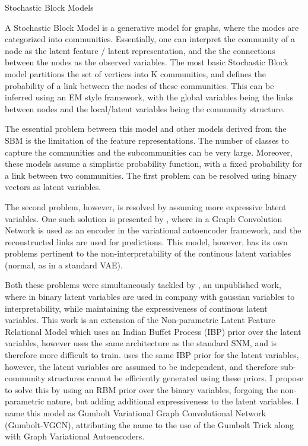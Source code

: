 \documentclass{article}
\begin{document}
\begin{psection}{Stochastic Block Models}

	A Stochastic Block Model is a generative model for graphs, where the modes are categorized into communities. Essentially, one can interpret the community of a node as the latent feature / latent representation, and the the connections between the nodes as the observed variables. The most basic Stochastic Block model partitions the set of vertices into K communities, and defines the probability of a link between the nodes of these communities. This can be inferred using an EM style framework, with the global variables being the links between nodes and the local/latent variables being the community structure.

	The essential problem between this model and other models derived from the SBM is the limitation of the feature representations. The number of classes to capture the communities and the subcommunities can be very large. Moreover, these models assume a simplistic probability function, with a fixed probability for a link between two communities. The first problem can be resolved using binary vectors as latent variables.

	The second problem, however, is resolved by assuming more expressive latent variables. One such solution is presented by \cite{gvae}, where in a Graph Convolution Network is used as an encoder in the variational autoencoder framework, and the reconstructed links are used for predictions. This model, however, has its own problems pertinent to the non-interpretability of the continous latent variables (normal, as in a standard VAE).

	Both these problems were simultaneously tackled by \cite{sbm-gnn}, an unpublished work, where in binary latent variables are used in company with gaussian variables to interpretability, while maintaining the expressiveness of continous latent variables. This work is an extension of the Non-parametric Latent Feature Relational Model \citep{nlfrm} which uses an Indian Buffet Process (IBP) prior over the latent variables, however uses the same architecture as the standard SNM, and is therefore more difficult to train. \cite{sbm-gnn} uses the same IBP prior for the latent variables, however, the latent variables are assumed to be independent, and therefore sub-community structures cannot be efficiently generated using these priors. I propose to solve this by using an RBM prior over the binary variables, forgoing the non-parametric nature, but adding additional expressiveness to the latent variables. I name this model as Gumbolt Variational Graph Convolutional Network (Gumbolt-VGCN), attributing the name to the use of the Gumbolt Trick along with Graph Variational Autoencoders.

\end{psection}
\end{document}
